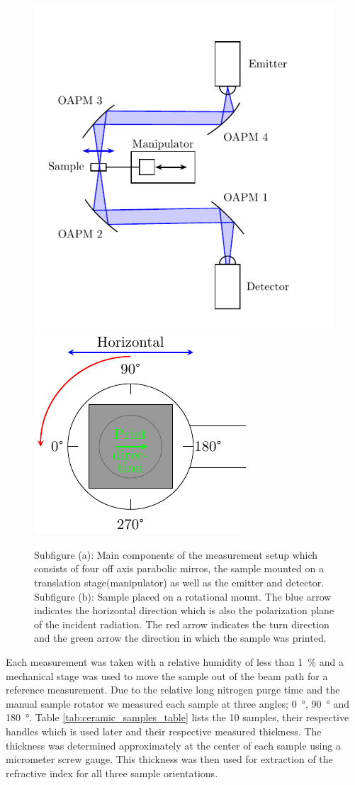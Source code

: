 \begin{figure}[H]
    \centering
    \subcaptionbox{\label{fig:setup_1}}
        {\hspace*{-2em}\includegraphics[width=0.45\linewidth]{images/appendix/Setup-THz-TDS-HHI.pdf}}
    \qquad
    \subcaptionbox{\label{fig:setup_2}}
        {\hspace*{-2em}\includegraphics[width=0.45\linewidth]{images/appendix/sample_mount.pdf}}
    
    \caption{Subfigure (a): Main components of the measurement setup which consists of four off axis parabolic mirros, the sample mounted on a translation stage(manipulator) as well as the emitter and detector. Subfigure (b): Sample placed on a rotational mount. The blue arrow indicates the horizontal direction which is also the polarization plane of the incident radiation. The red arrow indicates the turn direction and the green arrow the direction in which the sample was printed.}
    \label{fig:THz-TDS-HHI}
\end{figure}

Each measurement was taken with a relative humidity of less than \SI{1}{\percent} and a mechanical stage was used to move the sample out of the beam path for a reference measurement. Due to the relative long nitrogen purge time and the manual sample rotator we measured each sample at three angles; \SI{0}{\degree}, \SI{90}{\degree} and \SI{180}{\degree}.
Table \ref{tab:ceramic_samples_table} lists the 10 samples, their respective handles which is used later and their respective measured thickness. The thickness was determined approximately at the center of each sample using a micrometer screw gauge. This thickness was then used for extraction of the refractive index for all three sample orientations. 

